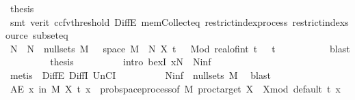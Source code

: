 \begin{isabellebody}
\ {\isacharquery}{\kern0pt}thesis\isanewline
\ \ \ \ \ \ \ \ \ \ \isamarkupfalse%
\ {\isacharparenleft}{\kern0pt}smt\ {\isacharparenleft}{\kern0pt}verit{\isacharcomma}{\kern0pt}\ ccfv{\isacharunderscore}{\kern0pt}threshold{\isacharparenright}{\kern0pt}\ DiffE\ mem{\isacharunderscore}{\kern0pt}Collect{\isacharunderscore}{\kern0pt}eq\ restrict{\isacharunderscore}{\kern0pt}index{\isacharunderscore}{\kern0pt}process\ restrict{\isacharunderscore}{\kern0pt}index{\isacharunderscore}{\kern0pt}source\ subset{\isacharunderscore}{\kern0pt}eq{\isacharparenright}{\kern0pt}\isanewline
\ \ \ \ \ \ \isamarkupfalse%
\isanewline
\ \ \ \ \ \ \isamarkupfalse%
\ \isamarkupfalse%
\ N\ \ {\isachardoublequoteopen}N\ {\isasymin}\ null{\isacharunderscore}{\kern0pt}sets\ {\isacharquery}{\kern0pt}M{\isachardoublequoteclose}\ {\isachardoublequoteopen}{\isasymforall}{\isasymomega}\ {\isasymin}\ space\ {\isacharquery}{\kern0pt}M\ {\isacharminus}{\kern0pt}\ N{\isachardot}{\kern0pt}\ X\ t\ {\isasymomega}\ {\isacharequal}{\kern0pt}\ {\isacharparenleft}{\kern0pt}Mod\ {\isacharparenleft}{\kern0pt}real{\isacharunderscore}{\kern0pt}of{\isacharunderscore}{\kern0pt}int\ {\isasymlfloor}t{\isasymrfloor}\ {\isacharplus}{\kern0pt}\ {}{\isacharparenright}{\kern0pt}{\isacharparenright}{\kern0pt}\ t\ {\isasymomega}{\isachardoublequoteclose}\isanewline
\ \ \ \ \ \ \ \ \isamarkupfalse%
\ blast\isanewline
\ \ \ \ \ \ \isamarkupfalse%
\ \isamarkupfalse%
\ {\isacharquery}{\kern0pt}thesis\isanewline
\ \ \ \ \ \ \ \ \isamarkupfalse%
\ {\isacharparenleft}{\kern0pt}intro\ bexI{\isacharbrackleft}{\kern0pt}\ x{\isacharequal}{\kern0pt}{\isachardoublequoteopen}N\ {\isasymunion}\ N{\isacharunderscore}{\kern0pt}inf{\isachardoublequoteclose}{\isacharbrackright}{\kern0pt}{\isacharparenright}{\kern0pt}\isanewline
\ \ \ \ \ \ \ \ \ \isamarkupfalse%
\ {\isacharparenleft}{\kern0pt}metis\ {\isachardoublequoteopen}{}{\isachardoublequoteclose}\ DiffE\ DiffI\ UnCI{\isacharparenright}{\kern0pt}\isanewline
\ \ \ \ \ \ \ \ \isamarkupfalse%
\ {\isacartoucheopen}N{\isacharunderscore}{\kern0pt}inf\ {\isasymin}\ null{\isacharunderscore}{\kern0pt}sets\ {\isacharquery}{\kern0pt}M{\isacartoucheclose}\ \isamarkupfalse%
\ blast\isanewline
\ \ \ \ \isamarkupfalse%
\isanewline
\ \ \ \ \isamarkupfalse%
\ \isamarkupfalse%
\ {\isachardoublequoteopen}AE\ x\ in\ {\isacharquery}{\kern0pt}M{\isachardot}{\kern0pt}\ X\ t\ x\ {\isacharequal}{\kern0pt}\ {\isacharparenleft}{\kern0pt}prob{\isacharunderscore}{\kern0pt}space{\isachardot}{\kern0pt}process{\isacharunderscore}{\kern0pt}of\ {\isacharquery}{\kern0pt}M\ {\isacharparenleft}{\kern0pt}proc{\isacharunderscore}{\kern0pt}target\ X{\isacharparenright}{\kern0pt}\ {\isacharbraceleft}{\kern0pt}{}{\isachardot}{\kern0pt}{\isachardot}{\kern0pt}{\isacharbraceright}{\kern0pt}\ X{\isacharunderscore}{\kern0pt}mod\ default{\isacharparenright}{\kern0pt}\ t\ x{\isachardoublequoteclose}\isanewline

\end{isabellebody}
